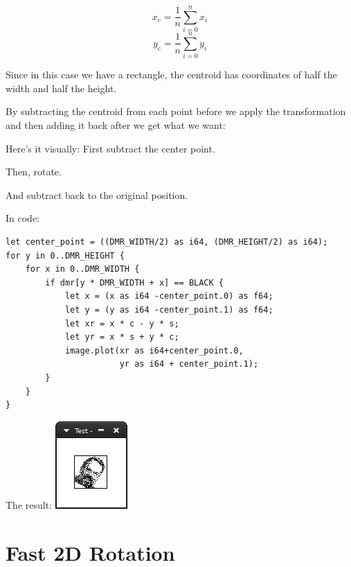 \documentclass[12pt,openany,a4,usenames,dvipsnames]{book}
\begin{document}
$$ x_c = \frac{1}{n}\sum_{i=0}^{n} x_i $$
$$ y_c = \frac{1}{n}\sum_{i=0}^{n} y_i $$

Since in this case we have a rectangle, the centroid has coordinates of half the width and half the height.

By subtracting the centroid from each point before we apply the transformation and then adding it back after we get what we want:

Here's it visually: First subtract the center point.

\begin{figure}[H]
\centering
\def\svgscale{0.6}

\end{figure}

Then, rotate.

\begin{figure}[H]
\centering
\def\svgscale{0.6}

\end{figure}

And subtract back to the original position.

\begin{figure}[H]
\centering
\def\svgscale{0.6}

\end{figure}

In code:

\begin{verbatim}
let center_point = ((DMR_WIDTH/2) as i64, (DMR_HEIGHT/2) as i64);
for y in 0..DMR_HEIGHT {
    for x in 0..DMR_WIDTH {
        if dmr[y * DMR_WIDTH + x] == BLACK {
            let x = (x as i64 -center_point.0) as f64;
            let y = (y as i64 -center_point.1) as f64;
            let xr = x * c - y * s;
            let yr = x * s + y * c;
            image.plot(xr as i64+center_point.0,
                       yr as i64 + center_point.1);
        }
    }
}
\end{verbatim}

The result: \includegraphics{figures/ch11-3.png}

\section{Fast 2D Rotation}
\skelpar%
\end{document}
